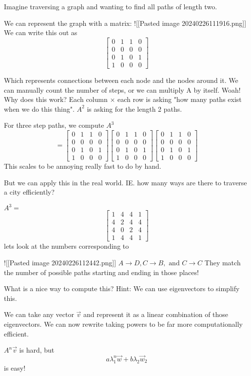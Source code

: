 
Imagine traversing a graph and wanting to find all paths of length two. 

We can represent the graph with a matrix:
![[Pasted image 20240226111916.png]]
We can write this out as 
$$
\begin{bmatrix}
0 & 1 & 1 & 0 \\
0 & 0 & 0 & 0 \\
0 & 1 & 0 & 1 \\
1 & 0 & 0 & 0
\end{bmatrix}
$$

Which represents connections between each node and the nodes around it. We can manually count the number of steps, or we can multiply A by itself. Woah! Why does this work? Each column $\times$ each row is asking "how many paths exist when we do this thing". $A^{2}$ is asking for the length 2 paths.
$$

$$

For three step paths, we compute
$A^{3}$
$$
= \begin{bmatrix}
0 & 1 & 1 & 0 \\
0 & 0 & 0 & 0 \\
0 & 1 & 0 & 1 \\
1 & 0 & 0 & 0
\end{bmatrix}\begin{bmatrix}
0 & 1 & 1 & 0 \\
0 & 0 & 0 & 0 \\
0 & 1 & 0 & 1 \\
1 & 0 & 0 & 0
\end{bmatrix}\begin{bmatrix}
0 & 1 & 1 & 0 \\
0 & 0 & 0 & 0 \\
0 & 1 & 0 & 1 \\
1 & 0 & 0 & 0
\end{bmatrix}
$$
This scales to be annoying really fast to do by hand.

But we can apply this in the real world. IE. how many ways are there to traverse a city efficiently? 

$A^{3} =$
$$
\begin{bmatrix}
1 & 4 & 4 & 1 \\
4 & 2 & 4 & 4 \\
4 & 0 & 2 & 4 \\
1 & 4 & 4 & 1
\end{bmatrix}
$$
lets look at the numbers corresponding to 

![[Pasted image 20240226112442.png]]
$A\to D,C\to B,\text{ and } C\to C$
They match the number of possible paths starting and ending in those places!

What is a nice way to compute this? Hint: We can use eigenvectors to simplify this.

We can take any vector $\vec{v}$ and represent it as a linear combination of those eigenvectors. We can now rewrite taking powers to be far more computationally efficient.

$A^{n}\vec{v}$ is hard, but 
$$
a \lambda_{1}^{n}\vec{w}+b \lambda_{2} \vec{w}_{2}
$$
is easy!

